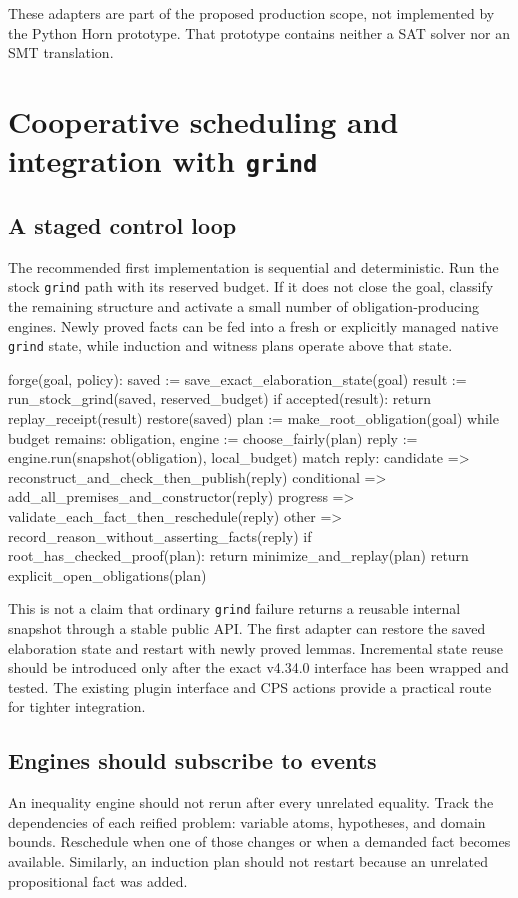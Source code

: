 \documentclass[11pt,letterpaper]{article}
\newcommand{\grind}{\texttt{grind}}
\theoremstyle{definition}
\theoremstyle{remark}
\begin{document}
These adapters are part of the proposed production scope, not implemented by the Python Horn prototype. That prototype contains neither a SAT solver nor an SMT translation.

\section{Cooperative scheduling and integration with \grind{}}
\subsection{A staged control loop}
The recommended first implementation is sequential and deterministic. Run the stock \grind{} path with its reserved budget. If it does not close the goal, classify the remaining structure and activate a small number of obligation-producing engines. Newly proved facts can be fed into a fresh or explicitly managed native \grind{} state, while induction and witness plans operate above that state.

\begin{code}
forge(goal, policy):
  saved := save_exact_elaboration_state(goal)
  result := run_stock_grind(saved, reserved_budget)
  if accepted(result): return replay_receipt(result)
  restore(saved)
  plan := make_root_obligation(goal)
  while budget remains:
    obligation, engine := choose_fairly(plan)
    reply := engine.run(snapshot(obligation), local_budget)
    match reply:
      candidate    => reconstruct_and_check_then_publish(reply)
      conditional  => add_all_premises_and_constructor(reply)
      progress     => validate_each_fact_then_reschedule(reply)
      other        => record_reason_without_asserting_facts(reply)
    if root_has_checked_proof(plan):
      return minimize_and_replay(plan)
  return explicit_open_obligations(plan)
\end{code}
This is not a claim that ordinary \grind{} failure returns a reusable internal snapshot through a stable public API. The first adapter can restore the saved elaboration state and restart with newly proved lemmas. Incremental state reuse should be introduced only after the exact v4.34.0 interface has been wrapped and tested. The existing plugin interface and CPS actions provide a practical route for tighter integration.\cite{grindpaper,grindaction}

\subsection{Engines should subscribe to events}
An inequality engine should not rerun after every unrelated equality. Track the dependencies of each reified problem: variable atoms, hypotheses, and domain bounds. Reschedule when one of those changes or when a demanded fact becomes available. Similarly, an induction plan should not restart because an unrelated propositional fact was added.
\end{document}
